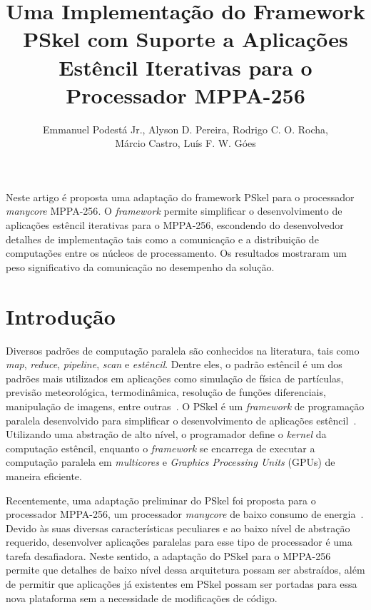 \documentclass[12pt]{article}
\title{Uma Implementação do Framework PSkel com Suporte a Aplicações Estêncil Iterativas para o Processador MPPA-256}
\author{Emmanuel Podestá Jr.\inst{1}, Alyson D. Pereira\inst{1}, Rodrigo C. O. Rocha\inst{2},\\Márcio Castro\inst{1}, Luís F. W. Góes\inst{2}}
\newcommand{\fw}{\textit{framework}\xspace}
\newcommand{\pskel}{{\small \textsf{PSkel}}\xspace}
\newcommand{\mppa}{{\small \textsf{MPPA-256}}\xspace}
\begin{document}
 

\maketitle

%
     
\begin{resumo} 
Neste artigo é proposta uma adaptação do framework PSkel para o processador \textit{manycore} \mppa. O \fw permite simplificar o desenvolvimento de aplicações estêncil iterativas para o \mppa, escondendo do desenvolvedor detalhes de implementação tais como a comunicação e a distribuição de computações entre os núcleos de processamento. Os resultados mostraram um peso significativo da comunicação no desempenho da solução.
\end{resumo}

\section{Introdução}

Diversos padrões de computação paralela são conhecidos na literatura, tais como \textit{map}, \textit{reduce}, \textit{pipeline}, \textit{scan} e \textit{estêncil}. Dentre eles, o padrão estêncil é um dos padrões mais utilizados em aplicações como simulação de física de partículas, previsão meteorológica, termodinâmica, resolução de funções diferenciais, manipulação de imagens, entre outras~\cite{Rahman:2011:USC:2016604.2016641}. O \pskel é um \fw de programação paralela desenvolvido para simplificar o desenvolvimento de aplicações estêncil~\cite{pereira15}. Utilizando uma abstração de alto nível, o programador define o \emph{kernel} da computação estêncil, enquanto o \fw se encarrega de executar a computação paralela em \textit{multicores} e \textit{Graphics Processing Units} (GPUs) de maneira eficiente. 

Recentemente, uma adaptação preliminar do \pskel foi proposta para o processador \mppa, um processador \textit{manycore} de baixo consumo de energia~\cite{Castro-Podesta-ERAD:2016}. Devido às suas diversas características peculiares e ao baixo nível de abstração requerido, desenvolver aplicações paralelas para esse tipo de processador é uma tarefa desafiadora. Neste sentido, a adaptação do \pskel para o \mppa permite que detalhes de baixo nível dessa arquitetura possam ser abstraídos, além de permitir que aplicações já existentes em \pskel possam ser portadas para essa nova plataforma sem a necessidade de modificações de código.
\end{document}
